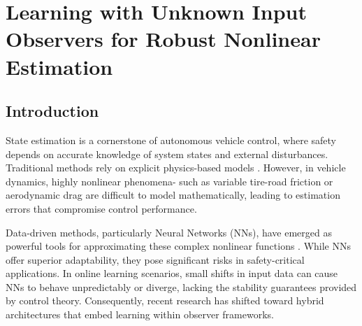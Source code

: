 \chapter[Learning with Unknown Input Observers for Robust Nonlinear Estimation]{Learning with Unknown Input Observers for Robust Nonlinear Estimation}\label{chp4_chap}


\section{Introduction}


State estimation is a cornerstone of autonomous vehicle control, where safety depends on accurate knowledge of system states and external disturbances. Traditional methods rely on explicit physics-based models \cite{State_Esti2017}. However, in vehicle dynamics, highly nonlinear phenomena- such as variable tire-road friction or aerodynamic drag are difficult to model mathematically, leading to estimation errors that compromise control performance.

Data-driven methods, particularly Neural Networks (NNs), have emerged as powerful tools for approximating these complex nonlinear functions \citep{2006Apdat, HO_GP}. While NNs offer superior adaptability, they pose significant risks in safety-critical applications. 
In online learning scenarios, small shifts in input data can cause NNs to behave unpredictably or diverge, lacking the stability guarantees provided by control theory. 
Consequently, recent research has shifted toward hybrid architectures that embed learning within observer frameworks.

